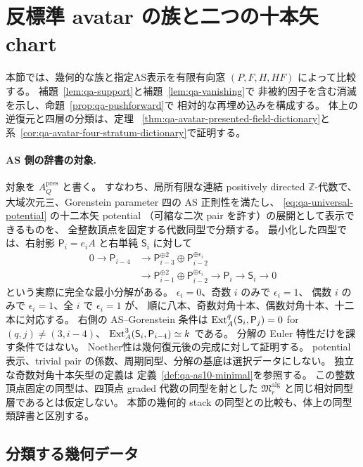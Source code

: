 \section{反標準 avatar の族と二つの十本矢 chart}
\label{sec:qa-avatar-charts}

本節では、幾何的な族と指定AS表示を有限有向窓
$(P,F,H,HF)$ によって比較する。
補題~\ref{lem:qa-support}と補題~\ref{lem:qa-vanishing}で
非被約因子を含む消滅を示し、命題~\ref{prop:qa-pushforward}で
相対的な再埋め込みを構成する。
体上の逆復元と四層の分類は、定理~
\ref{thm:qa-avatar-presented-field-dictionary}と
系~\ref{cor:qa-avatar-four-stratum-dictionary}で証明する。

\paragraph{AS 側の辞書の対象.}
対象を $A_Q^{\mathrm{pres}}$ と書く。
すなわち、局所有限な連結 positively directed $\mathbb Z$-代数で、
大域次元三、Gorenstein parameter 四の AS 正則性を満たし、
\eqref{eq:qa-universal-potential} の十二本矢 potential
（可縮な二次 pair を許す）の展開として表示できるものを、
全整数頂点を固定する代数同型で分類する。
最小化した四型では、右射影 $\mathsf P_i=e_iA$ と右単純 $\mathsf S_i$ に対して
\[
\begin{aligned}
0\longrightarrow\mathsf P_{i-4}
 &\longrightarrow\mathsf P_{i-3}^{\oplus2}\oplus\mathsf P_{i-2}^{\oplus\epsilon_i}\\
 &\longrightarrow\mathsf P_{i-1}^{\oplus2}\oplus\mathsf P_{i-2}^{\oplus\epsilon_i}
 \longrightarrow\mathsf P_i\longrightarrow\mathsf S_i\longrightarrow0
\end{aligned}
\]
という実際に完全な最小分解がある。
$\epsilon_i=0$、奇数 $i$ のみで $\epsilon_i=1$、
偶数 $i$ のみで $\epsilon_i=1$、全 $i$ で $\epsilon_i=1$ が、
順に八本、奇数対角十本、偶数対角十本、十二本に対応する。
右側の AS--Gorenstein 条件は
$\operatorname{Ext}_A^q(\mathsf S_i,\mathsf P_j)=0$ for $(q,j)\ne(3,i-4)$、
$\operatorname{Ext}_A^3(\mathsf S_i,\mathsf P_{i-4})\simeq k$ である。
分解の Euler 特性だけを課す条件ではない。
Noether性は幾何復元後の完成に対して証明する。
potential 表示、trivial pair の係数、周期同型、分解の基底は選択データにしない。
独立な奇数対角十本矢型の定義は
定義~\ref{def:qa-as10-minimal}を参照する。
この整数頂点固定の同型は、四頂点 graded 代数の同型を射とした
$\mathfrak M_r^{\mathrm{alg}}$ と同じ相対同型層であるとは仮定しない。
本節の幾何的 stack の同型との比較も、体上の同型類辞書と区別する。

\subsection{分類する幾何データ}

